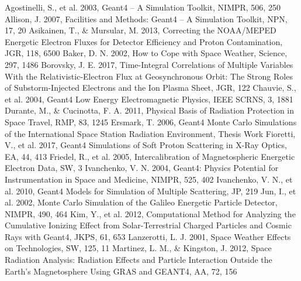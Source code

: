 \documentclass{jkas}
\begin{document}
\begin{thebibliography}{}


 Agostinelli, S., et al. 2003, Geant4 -- A Simulation Toolkit, NIMPR, 506, 250
 Allison, J. 2007, Facilities and Methods: Geant4 -- A Simulation Toolkit, NPN, 17, 20
 Asikainen, T., \& Mursular, M. 2013, Correcting the NOAA/MEPED Energetic Electron Fluxes for Detector Efficiency and Proton Contamination, JGR, 118, 6500
 Baker, D. N. 2002, How to Cope with Space Weather, Science, 297, 1486
 Borovsky, J. E. 2017, Time-Integral Correlations of Multiple Variables With the Relativistic-Electron Flux at Geosynchronous Orbit: The Strong Roles of Substorm-Injected Electrons and the Ion Plasma Sheet, JGR, 122
 Chauvie, S., et al. 2004, Geant4 Low Energy Electromagnetic Physics, IEEE SCRNS, 3, 1881
 Durante, M., \& Cucinotta, F. A. 2011, Physical Basis of Radiation Protection in Space Travel, RMP, 83, 1245
 Ersmark, T. 2006, Geant4 Monte Carlo Simulations of the International Space Station Radiation Environment, Thesis Work
 Fioretti, V., et al. 2017, Geant4 Simulations of Soft Proton Scattering in X-Ray Optics, EA, 44, 413
 Friedel, R., et al. 2005, Intercalibration of Magnetospheric Energetic Electron Data, SW, 3
 Ivanchenko, V. N. 2004, Geant4: Physics Potential for Instrumentation in Space and Medicine, NIMPR, 525, 402
 Ivanchenko, V. N., et al. 2010, Geant4 Models for Simulation of Multiple Scattering, JP, 219
 Jun, I., et al. 2002, Monte Carlo Simulation of the Galileo Energetic Particle Detector, NIMPR, 490, 464
 Kim, Y., et al. 2012, Computational Method for Analyzing the Cumulative Ionizing Effect from Solar-Terrestrial Charged Particles and Cosmic Rays with Geant4, JKPS, 61, 653
 Lanzerotti, L. J. 2001, Space Weather Effects on Technologies, SW, 125, 11
 Martinez, L. M., \& Kingston, J. 2012, Space Radiation Analysis: Radiation Effects and Particle Interaction Outside the Earth's Magnetosphere Using GRAS and GEANT4, AA, 72, 156

\end{thebibliography}
\end{document}
